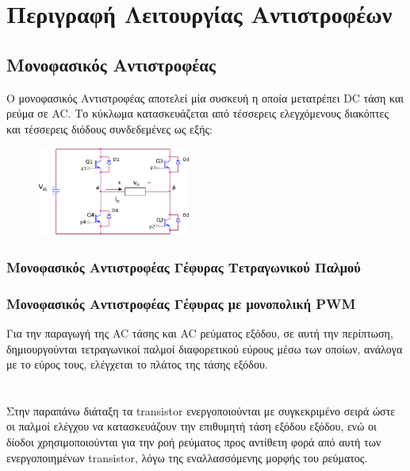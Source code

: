 \section{Περιγραφή Λειτουργίας Αντιστροφέων}

\subsection{Μονοφασικός Αντιστροφέας}
\noindent
Ο μονοφασικός Αντιστροφέας αποτελεί μία συσκευή η οποία μετατρέπει DC τάση και ρεύμα σε AC. Το κύκλωμα κατασκευάζεται από τέσσερεις ελεγχόμενους διακόπτες και τέσσερεις διόδους συνδεδεμένες ως εξής:
\begin{figure}[H]
	\centering
	\includegraphics[width=0.45\textwidth]{Images/circuit1.png}
	\label{circuit_1}
\end{figure}

\subsubsection{Μονοφασικός Αντιστροφέας Γέφυρας Τετραγωνικού Παλμού}
\subsubsection{Μονοφασικός Αντιστροφέας Γέφυρας με μονοπολική PWM}
\noindent
Για την παραγωγή της AC τάσης και AC ρεύματος εξόδου, σε αυτή την περίπτωση, δημιουργούνται τετραγωνικοί παλμοί διαφορετικού εύρους μέσω των οποίων, ανάλογα με το εύρος τους, ελέγχεται το πλάτος της τάσης εξόδου.
\noindent\\\\\\
Στην παραπάνω διάταξη τα transistor ενεργοποιούνται με συγκεκριμένο σειρά ώστε οι παλμοί ελέγχου να κατασκευάζουν την επιθυμητή τάση εξόδου εξόδου, ενώ οι δίοδοι χρησιμοποιούνται  για την ροή ρεύματος προς αντίθετη φορά από αυτή των ενεργοποιημένων transistor, λόγω της εναλλασσόμενης μορφής του ρεύματος.

